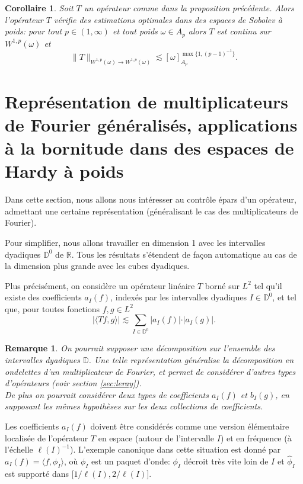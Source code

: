 \documentclass[11pt]{amsart}
\newtheorem{corollary}[theorem]{Corollaire}
\newtheorem*{remark}{Remarque}
\newcommand{\Dy}{{\mathbb D}}
\begin{document}
\begin{corollary} Soit $T$ un op\'erateur comme dans la proposition pr\'ec\'edente. Alors l'op\'erateur $T$ v\'erifie des estimations optimales dans des espaces de Sobolev \`a poids: pour tout $p\in (1,\infty)$ et tout poids $\omega\in A_p$ alors $T$ est continu sur $W^{1,p}(\omega)$ et
$$ \| T\|_{W^{1,p}(\omega) \to W^{1,p}(\omega)} \lesssim [\omega]_{A_p}^{\max\{1,(p-1)^{-1}\}}.$$

\end{corollary}


\section{Repr\'esentation de multiplicateurs de Fourier g\'en\'eralis\'es, applications \`a la bornitude dans des espaces de Hardy \`a poids}  \label{sec:haar}


Dans cette section, nous allons nous int\'eresser au contr\^ole \'epars d'un op\'erateur, admettant une certaine repr\'esentation (g\'en\'eralisant le cas des multiplicateurs de Fourier).

Pour simplifier, nous allons travailler en dimension 1 avec les intervalles dyadiques $\Dy^0$ de ${\mathbb R}$. Tous les r\'esultats s'\'etendent de fa\c{c}on automatique au cas de la dimension plus grande avec les cubes dyadiques.

Plus pr\'ecis\'ement, on consid\`ere un op\'erateur lin\'eaire $T$ born\'e sur $L^2$ tel qu'il existe des coefficients $a_I(f)$, index\'es par les intervalles dyadiques $I \in{\mathbb D}^0$, et tel que, pour toutes fonctions $f,g\in L^2$
$$ |\langle Tf,g\rangle| \lesssim \sum_{I\in {\mathbb D}^0} \vert a_I(f)\vert \cdot \vert a_I(g)\vert.$$

\begin{remark} On pourrait supposer une d\'ecomposition sur l'ensemble des intervalles dyadiques ${\mathbb D}$. Une telle repr\'esentation g\'en\'eralise la d\'ecomposition en ondelettes d'un multiplicateur de Fourier, et permet de consid\'erer d'autres types d'op\'erateurs (voir section \ref{sec:leray}). \\
De plus on pourrait consid\'erer deux types de coefficients $a_I(f)$ et $b_I(g)$, en supposant les m\^emes hypoth\`eses sur les deux collections de coefficients.
\end{remark}

Les coefficients $a_I(f)$ doivent \^etre consid\'er\'es comme une version \'el\'ementaire localis\'ee de l'op\'erateur $T$ en espace (autour de l'intervalle $I$) et en fr\'equence (\`a l'\'echelle $\ell(I)^{-1}$). L'exemple canonique dans cette situation est donn\'e par $a_I(f)=\langle f, \phi_I \rangle$, o\`u $\phi_I$ est un paquet d'onde: $\phi_I$ d\'ecroit tr\`es vite loin de $I$ et $\hat{\phi}_I$ est support\'e dans $\big[ 1/\ell(I), 2/\ell(I)  \big]$.
\end{document}

